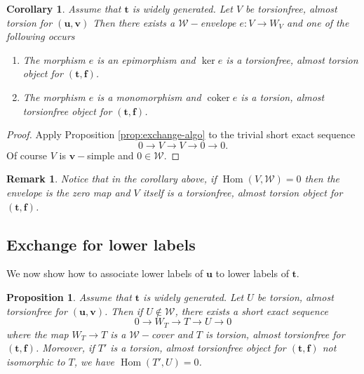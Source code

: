 \documentclass[10pt,a4paper]{amsart}
\newtheorem{proposition}[theorem]{Proposition}
\newtheorem{corollary}[theorem]{Corollary}
\newtheorem{remark}[theorem]{Remark}
\newcommand{\coker}{\operatorname{coker}}
\newcommand{\Hom}{\operatorname{Hom}}
\newcommand{\tpair}[2]{(\mathbf{#1}, \mathbf{#2})  }
\begin{document}
\begin{corollary}
\label{cor:up-exchange}
Assume that \(\mathbf t\) is widely generated. Let \(V\)  be torsionfree, almost torsion for \(\tpair{u}{v}\)
Then there exists a \( \mathcal{W}-\)envelope \( e : V \to W_V \) and one of the following occurs
\begin{enumerate}
\item The morphism \(e \) is an epimorphism and \(\ker e \) is a torsionfree, almost torsion object for \( \tpair{t}{f} \).
\item The morphism \(e \) is a monomorphism and \( \coker e \) is a torsion, almost torsionfree object for \( \tpair{t}{f} \).
\end{enumerate}
\end{corollary}

\begin{proof}
Apply Proposition \ref{prop:exchange-algo} to the trivial short exact sequence \[ 0 \to V \to V \to 0 \to 0. \] Of course \( V \) is \( \mathbf{v}-\)simple and \( 0 \in \mathcal{W} \).
\end{proof}

\begin{remark}
Notice that in the corollary above, if \( \Hom(V, \mathcal{W}) = 0 \) then the envelope is the zero map and \( V \) itself is a torsionfree, almost torsion object for \( \tpair{t}{f} \).
\end{remark}

\subsection{Exchange for lower labels}

We now show how to associate lower labels of \( \mathbf{u} \) to lower labels of \( \mathbf{t} \).



\begin{proposition}
\label{prop:lower-exchange}
Assume that \(\mathbf t\) is widely generated. Let \(U\)  be torsion, almost torsionfree for \(\tpair{u}{v}\). Then if \( U \not \in \mathcal{W} \), there exists a short exact sequence
\[
0 \to W_T \to T \to U \to 0 
\]
where the map \( W_T \to T \) is a \( \mathcal{W}-\)cover and \( T \) is torsion, almost torsionfree for \( \tpair{t}{f} \). Moreover, if \( T' \) is a torsion, almost torsionfree object for \( \tpair{t}{f} \) not isomorphic to \( T \), we have \( \Hom(T', U) = 0 \).
\end{proposition}
\end{document}
